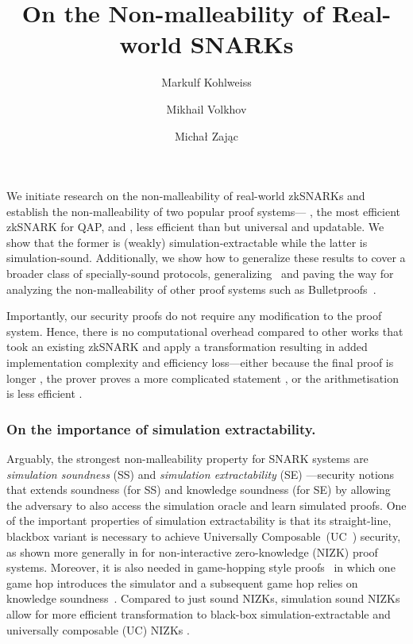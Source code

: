 \documentclass[runningheads,10pt]{llncs}
\title{On the Non-malleability of Real-world SNARKs}
\author{Markulf Kohlweiss\inst{1,2} \and Mikhail Volkhov\inst{1} \and Michał Zając\inst{3}}
\institute{University of Edinburgh, Edinburgh, UK \and IOHK \\ \email{mkohlwei@inf.ed.ac.uk}, \email{mikhail.volkhov@ed.ac.uk} \and Clearmatics, London UK \\ \email{m.p.zajac@gmail.com}}
\begin{document}
    \maketitle

    We initiate research on the non-malleability of real-world zkSNARKs and
    establish the non-malleability of two popular proof systems---\groth{}  \cite{EC:Groth16}, the most efficient zkSNARK for QAP, and \plonk{} \cite{EPRINT:GabWilCio19}, less efficient than \groth{} but universal and updatable.
    We show that the former is (weakly) simulation-extractable while the latter is simulation-sound.
    Additionally, we show how to generalize these results to cover a broader
    class of specially-sound protocols, generalizing~\cite{INDOCRYPT:FKMV12} and paving the way for analyzing the
    non-malleability of other proof systems such as Bulletproofs~\cite{SP:BBBPWM18}.

    Importantly, our security proofs do not require any modification to the proof system.
    Hence, there is no computational overhead compared to other works that took
    an existing zkSNARK and apply a transformation resulting in added
    implementation complexity and
    efficiency loss---either because the final proof is longer
    \cite{EPRINT:BowGab18}, the prover proves a more complicated statement
    \cite{ASIACCS:DerSla18,EPRINT:AbdRamSla20}, or the arithmetisation is less efficient \cite{C:GroMal17}.


    \subsubsection*{On the importance of simulation extractability.}
    Arguably, the strongest non-malleability property for SNARK systems are
  \emph{simulation soundness} (SS) and \emph{simulation extractability} (SE)
  \cite{FOCS:Sahai99,C:DDOPS01}---security notions that extends soundness (for
  SS) and knowledge soundness (for SE) by allowing the adversary to also access the simulation oracle and learn simulated proofs.
    One of the important properties of simulation extractability is that its
    straight-line, blackbox variant is necessary to achieve Universally Composable~(UC~\cite{FOCS:Canetti01}) security, as shown more generally in  \cite{STOC:CLOS02,AC:Groth06,EC:GroOstSah06} for non-interactive zero-knowledge (NIZK) proof systems. Moreover, it is also needed in game-hopping style proofs~\cite{EPRINT:Shoup04} in which one game hop
    introduces the simulator and a subsequent game hop relies on knowledge
    soundness~\cite{SP:KMSWP16,CCS:CamDriDub17}.
    Compared to just sound NIZKs, simulation sound NIZKs allow for more efficient transformation to black-box simulation-extractable and universally composable (UC) NIZKs \cite{AFRICACRYPT:Baghery19}.
\end{document}
